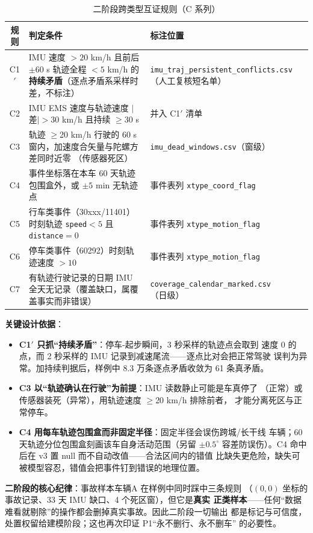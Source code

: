 \begin{table}[H]
\centering
\caption{二阶段跨类型互证规则（C 系列）}
\label{tab:rule-c}
\small
\begin{tabularx}{\textwidth}{cLL}
\toprule
规则 & 判定条件 & 标注位置 \\
\midrule
C1$'$ & IMU 速度 $>20$ km/h 且前后 $\pm60$ s 轨迹全程 $<5$ km/h 的
\textbf{持续矛盾}（逐点矛盾系采样时差，不标注） & \texttt{imu\_traj\_persistent\_conflicts.csv}（人工复核短名单） \\
C2 & IMU EMS 速度与轨迹速度 $|$差$|>30$ km/h 且持续 $\ge$30 s & 并入 C1$'$ 清单 \\
C3 & 轨迹 $\ge$20 km/h 行驶的 60 s 窗内，加速度合矢量与陀螺方差同时近零
（传感器死区） & \texttt{imu\_dead\_windows.csv}（窗级） \\
C4 & 事件坐标落在本车 60 天轨迹包围盒外，或 $\pm5$ min 无轨迹点 & 事件表列 \texttt{xtype\_coord\_flag} \\
C5 & 行车类事件（30xxx/11401）时刻轨迹 \texttt{speed}$<5$ 且 \texttt{distance}$=0$ & 事件表列 \texttt{xtype\_motion\_flag} \\
C6 & 停车类事件（60292）时刻轨迹速度 $>10$ & 事件表列 \texttt{xtype\_motion\_flag} \\
C7 & 有轨迹行驶记录的日期 IMU 全天无记录（覆盖缺口，属覆盖事实而非错误） & \texttt{coverage\_calendar\_marked.csv}（日级） \\
\bottomrule
\end{tabularx}
\end{table}

\noindent\textbf{关键设计依据}：
\begin{itemize}
  \item \textbf{C1$'$ 只抓“持续矛盾”}：停车-起步瞬间，3 秒采样的轨迹点会取到
        速度 0 的点，而 2 秒采样的 IMU 记录到减速尾流——逐点比对会把正常驾驶
        误判为异常。加持续判据后，样例中 8.3 万条逐点矛盾收敛为 61 条真矛盾。
  \item \textbf{C3 以“轨迹确认在行驶”为前提}：IMU 读数静止可能是车真停了
        （正常）或传感器装死（异常），用轨迹速度 $\ge$20 km/h 排除前者，
        才能分离死区与正常停车。
  \item \textbf{C4 用每车轨迹包围盒而非固定半径}：固定半径会误伤跨城/长干线
        车辆；60 天轨迹分位包围盒刻画该车自身活动范围（另留 $\pm0.5^\circ$
        容差防误伤）。C4 命中后在 v3 置 null 而不自动改值——合法区间内的错值
        比缺失更危险，缺失可被模型容忍，错值会把事件钉到错误的地理位置。
\end{itemize}

\begin{hlbox}
\textbf{二阶段的核心纪律}：事故样本车辆A 在样例中同时踩中三条规则
（$(0,0)$ 坐标的事故记录、33 天 IMU 缺口、4 个死区窗），但它是\textbf{真实
正类样本}——任何“数据难看就剔除”的操作都会删掉真实事故。因此二阶段一切输出
都是标记与可信度，处置权留给建模阶段；这也再次印证 P1“永不删行、永不删车”
的必要性。
\end{hlbox}

